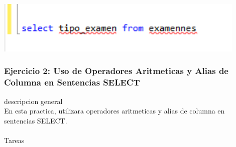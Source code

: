 \documentclass[12pt,letterpaper]{article}
\begin{document}
\begin{center}
\includegraphics[width=12cm]{./IMAGENES/imagen6_7}
\end{center}

\newpage
\subsubsection{Ejercicio 2: Uso de Operadores Aritmeticas y Alias de Columna en Sentencias SELECT} 
descripcion general  \\
En esta practica, utilizara operadores aritmeticas y alias de columna en sentencias SELECT.\\
\\
Tareas \\
\end{document}
